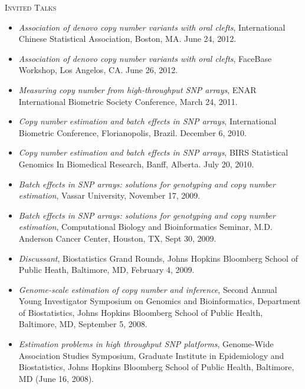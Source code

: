 \documentclass[11pt]{article}%
\begin{document}
{\vspace{2pt}

\noindent\textsc{Invited Talks}

\begin{itemize}
  \setlength{\itemsep}{-1pt}

\item {\it Association of denovo copy number variants with oral clefts},
  International Chinese Statistical Association, Boston, MA.  June 24,
  2012.

\item {\it Association of denovo copy number variants with oral clefts},
  FaceBase Workshop, Los Angelos, CA.  June 26,
  2012.

\item {\it Measuring copy number from high-throughput SNP arrays},
  ENAR International Biometric Society Conference, March 24, 2011.

\item {\it Copy number estimation and batch effects in SNP arrays},
  International Biometric Conference, Florianopolis, Brazil.  December
  6, 2010.

\item {\it Copy number estimation and batch effects in SNP arrays},
  BIRS Statistical Genomics In Biomedical Research, Banff,
  Alberta. July 20, 2010.

\item {\it Batch effects in SNP arrays: solutions for genotyping and
    copy number estimation}, Vassar University, November 17, 2009.

\item {\it Batch effects in SNP arrays: solutions for genotyping and
    copy number estimation}, Computational Biology and Bioinformatics
  Seminar, M.D. Anderson Cancer Center, Houston, TX, Sept 30, 2009.

\item {\it Discussant}, Biostatistics Grand Rounds, Johns Hopkins Bloomberg
  School of Public Heath, Baltimore, MD, February 4, 2009.

\item {\it Genome-scale estimation of copy number and inference},
  Second Annual Young Investigator Symposium on Genomics and
  Bioinformatics, Department of Biostatistics, Johns Hopkins Bloomberg
  School of Public Health, Baltimore, MD, September 5, 2008.

\item {\it Estimation problems in high throughput SNP platforms},
  Genome-Wide Association Studies Symposium, Graduate Institute in
  Epidemiology and Biostatistics, Johns Hopkins Bloomberg School of
  Public Health, Baltimore, MD (June 16, 2008).


\end{itemize}}
\end{document}

